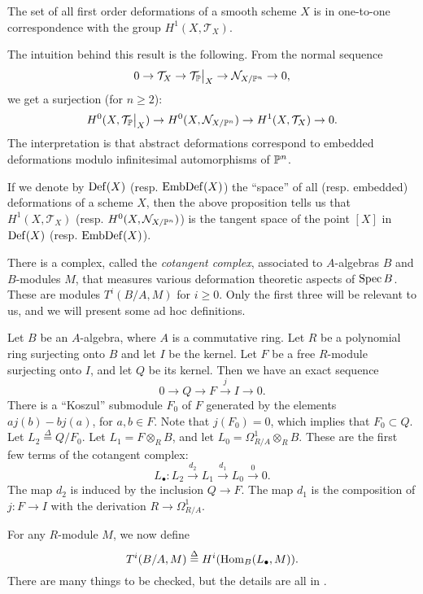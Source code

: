 \begin{proposition}
The set of all first order deformations of a smooth scheme $X$ is in one-to-one correspondence with the group $H^1(X,\mathcal T_X)$.
\end{proposition}

\begin{remark}
The intuition behind this result is the following. From the normal sequence
\[
0 \to \mathcal T_X \to \restr{\mathcal T_\P}{X} \to \mathcal N_{X/\P^n} \to 0,
\]
we get a surjection (for $n \geq 2$):
\[
H^0(X, \restr{\mathcal T_\P}{X}) \to H^0(X,\mathcal N_{X/\P^n}) \to H^1(X,\mathcal T_X) \to 0.
\]
The interpretation is that abstract deformations correspond to embedded deformations modulo infinitesimal automorphisms of $\P^n$.
\end{remark}

If we denote by $\Def(X)$  (resp. $\EmbDef(X)$) the ``space'' of all (resp. embedded) deformations of a scheme $X$, then the above proposition tells us that $H^1(X,\mathcal T_X)$ (resp. $H^0(X,\mathcal N_{X/\P^n})$) is the tangent space of the point $[X]$ in $\Def(X)$ (resp. $\EmbDef(X)$).

There is a complex, called the \emph{cotangent complex}, associated to $A$-algebras $B$ and $B$-modules $M$, that measures various deformation theoretic aspects of $\Spec B$. These are modules $T^i(B/A,M)$ for $i \geq 0$. Only the first three will be relevant to us, and we will present some ad hoc definitions.

Let $B$ be an $A$-algebra, where $A$ is a commutative ring. Let $R$ be a polynomial ring surjecting onto $B$ and let $I$ be the kernel. Let $F$ be a free $R$-module surjecting onto $I$, and let $Q$ be its kernel. Then we have an exact sequence
\[
0 \to Q \to F \xrightarrow{j} I \to 0.
\]
There is a ``Koszul'' submodule $F_0$ of $F$ generated by the elements $aj(b)-bj(a)$, for $a,b \in F$. Note that $j(F_0)=0$, which implies that $F_0 \subset Q$. Let $L_2 \stackrel \Delta = Q/F_0$. Let $L_1 = F \otimes_R B$, and let $L_0 = \Omega_{R/A}^1 \otimes_R B$. These are the first few terms of the cotangent complex:
\[
L_\bullet: L_2 \xrightarrow{d_2} L_1 \xrightarrow{d_1}  L_0 \xrightarrow{0} 0.
\]
The map $d_2$ is induced by the inclusion $Q \to F$. The map $d_1$ is the composition of $j:F \to I$ with the derivation $R \to \Omega^1_{R/A}$.

For any $R$-module $M$, we now define
\[
T^i(B/A,M) \stackrel \Delta = H^i(\Hom_B(L_\bullet,M)).
\]
There are many things to be checked, but the details are all in \cite{hartshorne_deformations}.


